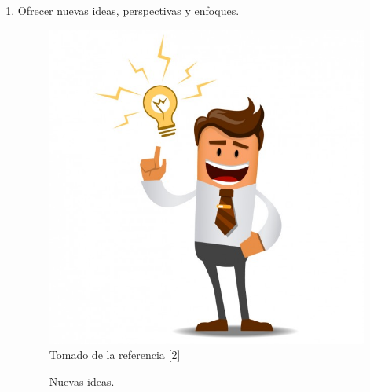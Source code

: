 \documentclass{beamer}
\newcounter{sauvegardeenumi}
\newcommand{\asuivre}{\setcounter{sauvegardeenumi}{\theenumi}}
\begin{document}
\begin{frame}
\begin{multicols}{2}
\begin{enumerate}
                    \item Ofrecer nuevas ideas, perspectivas y enfoques.
                        \begin{figure}
                            \includegraphics[scale=0.15]{figures/newIdeas}
                            \newline
                            {\tiny Tomado de la referencia [2] }
                            \caption{Nuevas ideas.}
                        \end{figure}
                        \asuivre
                \end{enumerate}
            \end{multicols}
    \end{frame}
\end{document}
